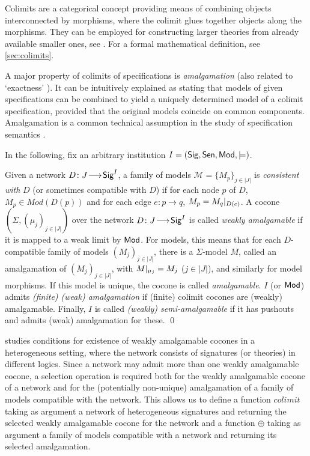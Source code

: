 \documentclass[10pt,fleqn,final]{scrreprt}
\newcommand{\Sig}{\mathsf{Sig}}
\newenvironment{definitions}[0]{\medskip }{}
\begin{document}
\begin{definitions}
Colimits are a categorical concept providing means of
combining objects interconnected by morphisms, where the colimit
glues together objects along the morphisms.
They can be employed for constructing larger theories from already available 
smaller ones, see \cite{GoguenBurstall92}. For a formal mathematical definition,
see \ref{sec:colimits}.


A major property of colimits of specifications is \emph{amalgamation} (also related to `exactness' \cite{DGS91}). It can be intuitively explained as 
stating that models of given
specifications can be combined to yield a uniquely determined model of
a colimit specification, provided that the original models coincide on
common components. Amalgamation is a common technical assumption in the 
study of specification semantics
\cite{STbook}.

In the following, fix an arbitrary institution
$I=(\Sig,\Sen,\Mod,\models)$.  

\begin{definition}
Given a network $D\map{J}{\Sig^I}$, 
a family of models $\mathcal{M} = \{M_p\}_{j\in |J|}$ is
\emph{consistent with} $D$ (or sometimes compatible with $D$) 
if for each node $p$ of $D$, $M_p \in Mod(D(p))$ and
for each edge $e:p\rightarrow q$, $M_p = M_q|_{D(e)}$.
  A cocone
$(\Sigma,(\mu_j)_{j\in|J|})$ over the network $D\map{J}{\Sig^I}$ is
called \emph{weakly amalgamable} if it is mapped to a weak limit by $\mathsf{Mod}$.
For models, this means that for each $D$-compatible family of
models $(M_j)_{j\in|J|}$, there is a $\Sigma$-model $M$, called an amalgamation of 
 $(M_j)_{j\in|J|}$,
with
$M|_{\mu_j}=M_j$ ($j\in|J|$), and similarly for model morphisms.
 If this model is unique, the cocone
is called \emph{amalgamable}. 
$I$ (or $\mathsf{Mod}$) admits \emph{(finite) (weak)
amalgamation} if (finite) colimit cocones are (weakly) amalgamable.
Finally, $I$ is called \emph{(weakly) semi-amalgamable} if 
it has pushouts and admits (weak) amalgamation for these.
\qed\end{definition}

\cite{weakcol} studies conditions for existence of weakly amalgamable cocones
in a heterogeneous setting, where the network consists of signatures (or theories)
in different logics. Since a network may admit more than one weakly amalgamable cocone,
a selection operation is required both for the weakly amalgamable cocone of a network 
and for the (potentially non-unique) amalgamation of a family of models compatible with the
network. This allows us to define a function
$colimit$ taking as argument a network of heterogeneous signatures and
returning the selected weakly amalgamable cocone for the network and
a function $\oplus$ taking as argument a family of models compatible with a network
and returning its selected amalgamation.


\end{definitions}
\end{document}
